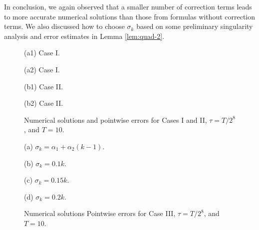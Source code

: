 \documentclass[10pt]{siamltex}
\begin{document}

In conclusion,  we again observed that a smaller number of correction terms leads to  more accurate numerical solutions than  those from formulas without correction terms.   We also discussed how to choose $\sigma_k$ based on some preliminary singularity analysis and
error estimates in Lemma  \ref{lem:quad-2}.

\begin{figure}[!t]
\begin{center}
\begin{minipage}{0.4\textwidth}\centering
{}  \par{(a1)   Case I.}
\end{minipage}
\begin{minipage}{0.4\textwidth}\centering
{}   \par{(a2) Case I.}
\end{minipage}
\begin{minipage}{0.4\textwidth}\centering
{}  \par{(b1)   Case II.}
\end{minipage}
\begin{minipage}{0.4\textwidth}\centering
{}   \par{(b2) Case II.}
\end{minipage}
\end{center}
\caption{Numerical solutions and pointwise errors for Cases I and II, $\tau=T/2^{8}$, and $T=10$.\label{fig5-2}}
\end{figure}

\begin{figure}[!t]
\begin{center}
\begin{minipage}{0.4\textwidth}\centering
{}   \par{(a)  $\sigma_{k}=\alpha_1+\alpha_2(k-1)$.}
\end{minipage}
\begin{minipage}{0.4\textwidth}\centering
{}  \par{(b)   $\sigma_{k}=0.1k$.}
\end{minipage}
\begin{minipage}{0.4\textwidth}\centering
{}   \par{(c) $\sigma_{k}=0.15k$.}
\end{minipage}
\begin{minipage}{0.4\textwidth}\centering
{}   \par{(d) $\sigma_{k}=0.2k$.}
\end{minipage}
\end{center}
\caption{Numerical solutions Pointwise errors  for Case III,  $\tau=T/2^{8}$, and $T=10$.\label{fig5-3}}
\end{figure}
\end{document}

